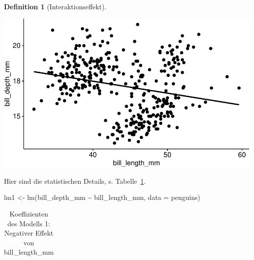 \documentclass[
  letterpaper,
]{scrbook}
\newenvironment{Shaded}{\begin{snugshade}}{\end{snugshade}}
\newcommand{\AttributeTok}[1]{\textcolor[rgb]{0.40,0.45,0.13}{#1}}
\newcommand{\FunctionTok}[1]{\textcolor[rgb]{0.28,0.35,0.67}{#1}}
\newcommand{\NormalTok}[1]{\textcolor[rgb]{0.00,0.23,0.31}{#1}}
\newcommand{\OtherTok}[1]{\textcolor[rgb]{0.00,0.23,0.31}{#1}}
\newcommand{\SpecialCharTok}[1]{\textcolor[rgb]{0.37,0.37,0.37}{#1}}
\theoremstyle{definition}
\theoremstyle{definition}
\theoremstyle{definition}
\newtheorem{definition}{Definition}[chapter]
\theoremstyle{remark}
\begin{document}
\begin{definition}[Interaktionseffekt]
\begin{center}
\includegraphics[width=0.7\linewidth,height=\textheight,keepaspectratio]{090-regression2_files/figure-pdf/unnamed-chunk-58-1.pdf}
\end{center}

Hier sind die statistischen Details, s. Tabelle~\ref{tbl-peng-simpson1}.

\begin{Shaded}
\begin{Highlighting}[]
\NormalTok{lm1 }\OtherTok{\textless{}{-}} \FunctionTok{lm}\NormalTok{(bill\_depth\_mm }\SpecialCharTok{\textasciitilde{}}\NormalTok{ bill\_length\_mm, }\AttributeTok{data =}\NormalTok{ penguins)}
\end{Highlighting}
\end{Shaded}

\begin{longtable}[]{@{}
  >{\raggedright\arraybackslash}p{}
  >{\centering\arraybackslash}p{}
  >{\centering\arraybackslash}p{}
  >{\centering\arraybackslash}p{}
  >{\centering\arraybackslash}p{}
  >{\centering\arraybackslash}p{}@{}}

\caption{\label{tbl-peng-simpson1}Koeffizienten des Modells 1: Negativer
Effekt von bill\_length\_mm}

\tabularnewline


\end{longtable}
\end{definition}
\end{document}
